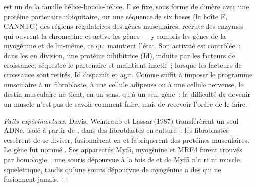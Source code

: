 \begin{proposition}\label{prop:b2:cell-differentiation:myod}
 est un  de la famille hélice-boucle-hélice.
Il se fixe, sous forme de dimère avec une protéine partenaire ubiquitaire,
sur une séquence de six bases (la boîte E, CANNTG) des régions
régulatrices des gènes musculaires, recrute des enzymes qui ouvrent la
chromatine et active les gènes --- y compris les gènes de la myogénine et
de  lui-même, ce qui maintient l'état. Son activité est contrôlée~:
dans les  en division, une protéine inhibitrice (Id), induite
par les facteurs de croissance, séquestre le partenaire et maintient
 inactif~; lorsque les facteurs de croissance sont retirés, Id
disparaît et  agit. Comme  suffit à imposer le programme
musculaire à un fibroblaste, à une cellule adipeuse ou à une cellule
nerveuse, le destin musculaire ne tient, en un sens, qu'à un seul gène~:
la difficulté de devenir un muscle n'est pas de savoir comment faire,
mais de recevoir l'ordre de le faire.
\end{proposition}
\begin{proof}[Faits expérimentaux]
Davis, Weintraub et Lassar (1987) transférèrent un seul ADNc, isolé à
partir de , dans des fibroblastes en culture~: les fibroblastes
cessèrent de se diviser, fusionnèrent en  et fabriquèrent des
protéines musculaires. Le gène fut nommé . Ses apparentés Myf5,
myogénine et MRF4 furent trouvés par homologie~; une souris dépourvue à
la fois de  et de Myf5 n'a ni  ni muscle squelettique,
tandis qu'une souris dépourvue de myogénine a des  qui ne
fusionnent jamais.
\end{proof}

